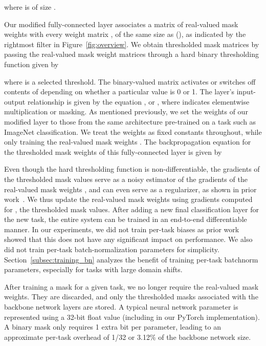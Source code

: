 \documentclass{llncs}
\begin{document}
where  is of size .

Our modified fully-connected layer associates a matrix of real-valued mask weights  with every weight matrix , of the same size as  (), as indicated by the rightmost filter in Figure~\ref{fig:overview}. We obtain thresholded mask matrices  by passing the real-valued mask weight matrices  through a hard binary thresholding function given by
\vspace{-4pt}

where  is a selected threshold.
The binary-valued matrix  activates or switches off contents of  depending on whether a particular value  is 0 or 1. The layer's input-output relationship is given by the equation , or , where  indicates elementwise multiplication or masking. As mentioned previously, we set the weights  of our modified layer to those from the same architecture pre-trained on a task such as ImageNet classification.
We treat the weights  as fixed constants throughout, while only training the real-valued mask weights .
The backpropagation equation for the thresholded mask weights  of this fully-connected layer is given by


Even though the hard thresholding function is non-differentiable, the gradients of the thresholded mask values  serve as a noisy estimator of the gradients of the real-valued mask weights , and can even serve as a regularizer, as shown in prior work~\cite{courbariaux2015binaryconnect,hubara2016binarized}. We thus update the real-valued mask weights  using gradients computed for , the thresholded mask values. After adding a new final classification layer for the new task, the entire system can be trained in an end-to-end differentiable manner. In our experiments, we did not train per-task biases as prior work~\cite{mallya2017packnet} showed that this does not have any significant impact on performance. We also did not train per-task batch-normalization parameters for simplicity. Section~\ref{subsec:training_bn} analyzes the benefit of training per-task batchnorm parameters, especially for tasks with large domain shifts.

After training a mask for a given task, we no longer require the real-valued mask weights. They are discarded, and only the thresholded masks associated with the backbone network layers are stored. A typical neural network parameter is represented using a 32-bit float value (including in our PyTorch implementation). A binary mask only requires 1 extra bit per parameter, leading to an approximate per-task overhead of 1/32 or 3.12\% of the backbone network size.  
\end{document}
